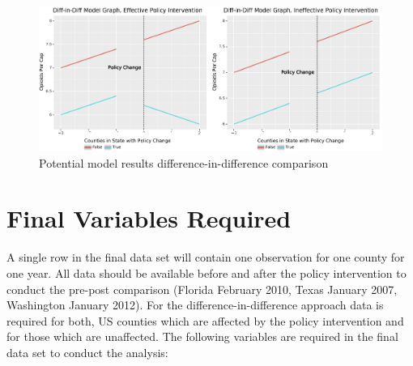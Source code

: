 \documentclass[12pt]{article}
\begin{document}
\begin{figure}[h]
    \centering
    \includegraphics[scale=.5]{41_project_strategy_potential_model_results_did.png}
    \caption{Potential model results difference-in-difference comparison }
    \label{fig:did}
\end{figure}



\vspace*{1cm}
\section{Final Variables Required}




A single row in the final data set will contain one observation for one county for one year. All data should be available before and after the policy intervention to conduct the pre-post comparison (Florida February 2010, Texas January 2007, Washington January 2012). For the difference-in-difference approach data is required for both, US counties which are affected by the policy intervention and for those which are unaffected.  The following variables are required in the final data set to conduct the analysis:
\end{document}
